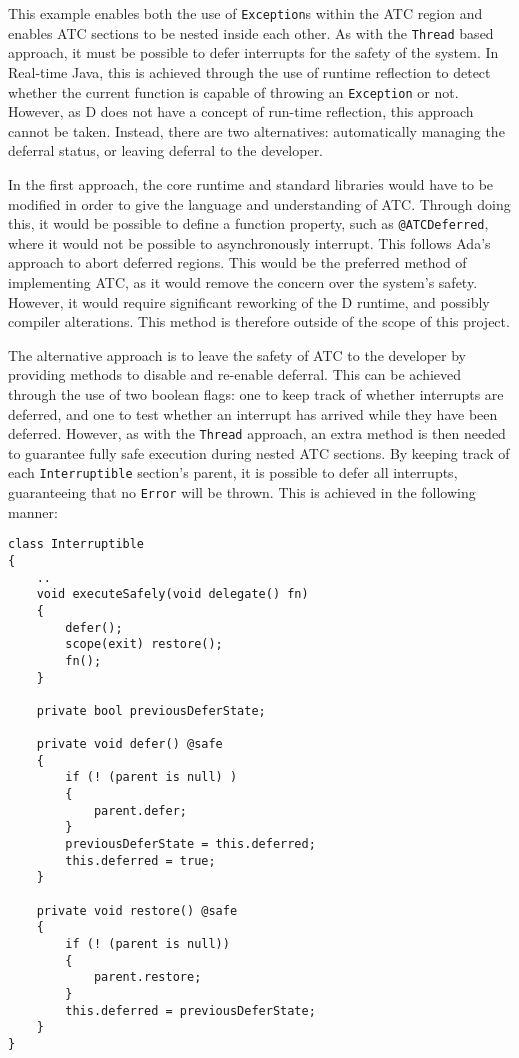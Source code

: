 This example enables both the use of \texttt{Exception}s within the ATC region and
enables ATC sections to be nested inside each other. 
As with the \texttt{Thread} based approach, it must be possible to defer interrupts
for the safety of the system. 
In Real-time Java, this is achieved through the use of runtime reflection to detect
whether the current function is capable of throwing an \texttt{Exception} or not.
However, as D does not have a concept of run-time reflection, this approach cannot be
taken. 
Instead, there are two alternatives: automatically managing the deferral
status, or leaving deferral to the developer. 
\par\bigskip\noindent
In the first approach, the core runtime and standard libraries would have to be 
modified in order to give the language and understanding of ATC. Through doing 
this, it would be possible to define a function property, such as \texttt{@ATCDeferred},  
where it would not be possible to asynchronously interrupt. This follows Ada's
approach to abort deferred regions. 
This would be the preferred method of implementing ATC, as it would remove the
concern over the system's safety. However, it would require significant
reworking of the D runtime, and possibly compiler alterations.
This method is therefore outside of the scope of this
project. 
\par\bigskip\noindent
The alternative approach is to leave the safety of ATC to the developer by
providing methods to disable and re-enable deferral.
This can be achieved through the use of two boolean flags: one to keep track
of whether interrupts are deferred, and one to test whether an interrupt has
arrived while they have been deferred. 
However, as with the \texttt{Thread} approach, an extra method is then needed 
to guarantee fully safe execution during nested ATC sections. By keeping
track of each \texttt{Interruptible} section's parent, it is possible to defer
all interrupts, guaranteeing that no \texttt{Error} will be thrown. This is
achieved in the following manner: 
\begin{lstlisting}[basicstyle=\small]
class Interruptible
{
    ..
    void executeSafely(void delegate() fn) 
    {
        defer();
        scope(exit) restore();
        fn();
    }

    private bool previousDeferState;

    private void defer() @safe
    {
        if (! (parent is null) )
        {
            parent.defer;
        }
        previousDeferState = this.deferred;
        this.deferred = true;
    }

    private void restore() @safe
    {
        if (! (parent is null))
        {
            parent.restore;
        }
        this.deferred = previousDeferState;
    }
}
\end{lstlisting}
